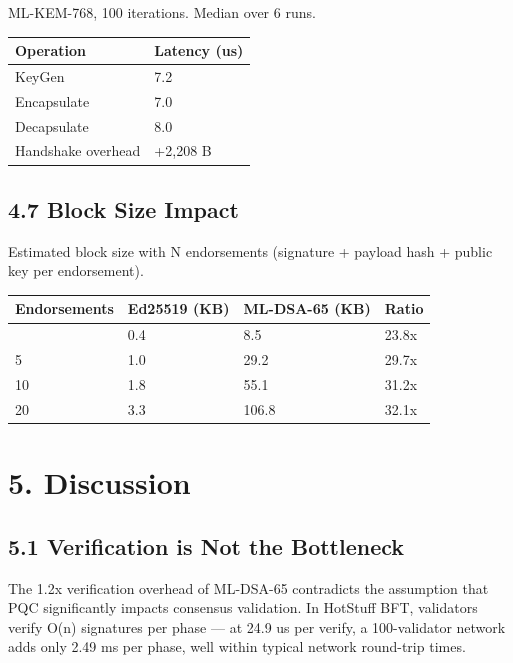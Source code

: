 \documentclass[
]{article}
\newcounter{none} %
\begin{document}
ML-KEM-768, 100 iterations. Median over 6 runs.

{\def\LTcaptype{none} %
\begin{longtable}[]{@{}ll@{}}
\toprule\noalign{}
Operation & Latency (us) \\
\midrule\noalign{}
\endhead
\bottomrule\noalign{}
\endlastfoot
KeyGen & 7.2 \\
Encapsulate & 7.0 \\
Decapsulate & 8.0 \\
Handshake overhead & +2,208 B \\
\end{longtable}
}

\subsection{4.7 Block Size Impact}\label{block-size-impact}

Estimated block size with N endorsements (signature + payload hash +
public key per endorsement).

{\def\LTcaptype{none} %
\begin{longtable}[]{@{}llll@{}}
\toprule\noalign{}
Endorsements & Ed25519 (KB) & ML-DSA-65 (KB) & Ratio \\
\midrule\noalign{}
\endhead
\bottomrule\noalign{}
\endlastfoot
1 & 0.4 & 8.5 & 23.8x \\
5 & 1.0 & 29.2 & 29.7x \\
10 & 1.8 & 55.1 & 31.2x \\
20 & 3.3 & 106.8 & 32.1x \\
\end{longtable}
}

\section{5. Discussion}\label{discussion}

\subsection{5.1 Verification is Not the
Bottleneck}\label{verification-is-not-the-bottleneck}

The 1.2x verification overhead of ML-DSA-65 contradicts the assumption
that PQC significantly impacts consensus validation. In HotStuff BFT,
validators verify O(n) signatures per phase --- at 24.9 us per verify, a
100-validator network adds only 2.49 ms per phase, well within typical
network round-trip times.
\end{document}
